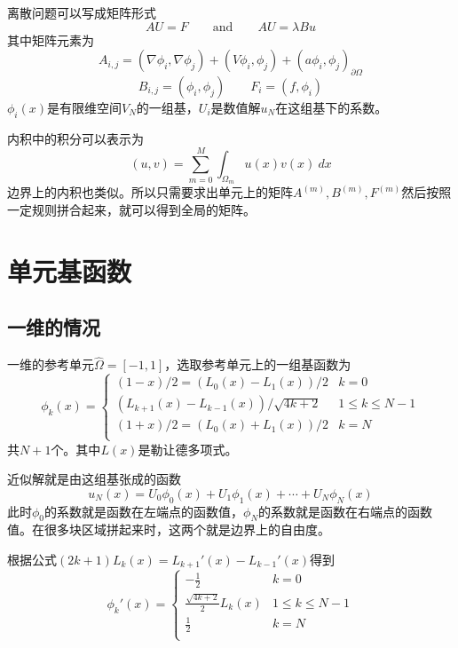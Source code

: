 \documentclass[UTF8,12pt]{article}
\begin{document}
离散问题可以写成矩阵形式
\begin{equation}
A U = F \qquad \text{and} \qquad A U = \lambda B u
\end{equation}
其中矩阵元素为
$$ A_{i,j} = (\nabla \phi_i, \nabla \phi_j) + (V \phi_i, \phi_j) + (a \phi_i, \phi_j)_{\partial\Omega} $$
$$ B_{i,j} = (\phi_i, \phi_j) \qquad F_i = (f, \phi_i) $$
$\phi_i(x)$是有限维空间$V_N$的一组基，$U_i$是数值解$u_N$在这组基下的系数。

内积中的积分可以表示为
$$ (u, v) = \sum_{m=0}^{M} \int_{\Omega_m} u(x) v(x) \ dx $$
边界上的内积也类似。所以只需要求出单元上的矩阵$A^{(m)},B^{(m)},F^{(m)}$然后按照一定规则拼合起来，就可以得到全局的矩阵。

\section{单元基函数}

\subsection{一维的情况}

一维的参考单元$\hat{\Omega} = [-1,1]$，选取参考单元上的一组基函数为
\begin{equation}
\phi_k(x) = \left\{ \begin{array}{ll}
(1-x)/2 = (L_0(x) - L_1(x))/2 & k = 0 \\
(L_{k+1}(x) - L_{k-1}(x)) / \sqrt{4k+2} & 1 \leq k \leq N-1 \\
(1+x)/2 = (L_0(x) + L_1(x))/2 & k = N \\
\end{array}  \right.
\end{equation}
共$N+1$个。其中$L(x)$是勒让德多项式。

近似解就是由这组基张成的函数
$$ u_N(x) = U_0 \phi_0(x) + U_1 \phi_1(x) + \cdots + U_N \phi_N(x) $$
此时$\phi_0$的系数就是函数在左端点的函数值，$\phi_N$的系数就是函数在右端点的函数值。在很多块区域拼起来时，这两个就是边界上的自由度。

根据公式$(2k+1) L_k(x) = L_{k+1}'(x) - L_{k-1}'(x)$得到
\begin{equation}
\phi_k'(x) = \left\{ \begin{array}{ll}
-\frac{1}{2} & k = 0 \\
\frac{\sqrt{4k+2}}{2} L_{k}(x) & 1 \leq k \leq N-1 \\
\frac{1}{2} & k = N \\
\end{array} \right.
\end{equation}
\end{document}
